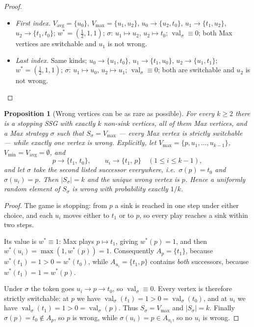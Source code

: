 \documentclass[11pt]{article}
\theoremstyle{plain}
\newtheorem{proposition}[theorem]{Proposition}
\theoremstyle{definition}
\DeclareMathOperator{\val}{val}
\newcommand{\Vmax}{V_{\max}}
\newcommand{\Vmin}{V_{\min}}
\newcommand{\Vavg}{V_{\mathrm{avg}}}
\begin{document}
\begin{proof}
\begin{itemize}[leftmargin=2.2em]
  $\sigma$: $u_4\mapsto u_1$, $u_5\mapsto u_0$;
  $\val_\sigma=(\tfrac16,\tfrac13,\tfrac23,\tfrac16,\tfrac13,\tfrac16)$;
  the current values are $\tfrac13$ at $u_4$ and $\tfrac16$ at $u_5$, and
  $u_5$ is not wrong.
\item \emph{First index.} $\Vavg=\{u_0\}$, $\Vmax=\{u_1,u_2\}$,
  $u_0\to\{u_2,t_0\}$, $u_1\to\{t_1,u_2\}$, $u_2\to\{t_1,t_0\}$;
  $w^\ast=(\tfrac12,1,1)$; $\sigma$: $u_1\mapsto u_2$, $u_2\mapsto t_0$;
  $\val_\sigma\equiv0$; both Max vertices are switchable and $u_1$ is
  not wrong.
\item \emph{Last index.} Same kinds; $u_0\to\{u_1,t_0\}$,
  $u_1\to\{t_1,u_0\}$, $u_2\to\{u_1,t_1\}$; $w^\ast=(\tfrac12,1,1)$;
  $\sigma$: $u_1\mapsto u_0$, $u_2\mapsto u_1$; $\val_\sigma\equiv0$; both
  are switchable and $u_2$ is not wrong.
\end{itemize}
\end{proof}

\begin{proposition}[Wrong vertices can be as rare as possible]\label{prop:needle}
For every $k\ge2$ there is a stopping SSG with exactly $k$ non-sink
vertices, all of them Max vertices, and a Max strategy $\sigma$ such that
$S_\sigma=\Vmax$ --- every Max vertex is strictly switchable --- while
exactly one vertex is wrong. Explicitly, let
$\Vmax=\{p,u_1,\dots,u_{k-1}\}$, $\Vmin=\Vavg=\emptyset$, and
\[
  p\to\{t_1,\,t_0\},\qquad u_i\to\{t_1,\,p\}\quad(1\le i\le k-1),
\]
and let $\sigma$ take the second listed successor everywhere, i.e.\
$\sigma(p)=t_0$ and $\sigma(u_i)=p$. Then $|S_\sigma|=k$ and the unique
wrong vertex is $p$. Hence a uniformly random element of $S_\sigma$ is
wrong with probability exactly $1/k$.
\end{proposition}

\begin{proof}
The game is stopping: from $p$ a sink is reached in one step under either
choice, and each $u_i$ moves either to $t_1$ or to $p$, so every play
reaches a sink within two steps.

Its value is $w^\ast\equiv1$: Max plays $p\mapsto t_1$, giving
$w^\ast(p)=1$, and then $w^\ast(u_i)=\max(1,w^\ast(p))=1$. Consequently
$A_p=\{t_1\}$, because $w^\ast(t_1)=1>0=w^\ast(t_0)$, while
$A_{u_i}=\{t_1,p\}$ contains \emph{both} successors, because
$w^\ast(t_1)=1=w^\ast(p)$.

Under $\sigma$ the token goes $u_i\to p\to t_0$, so $\val_\sigma\equiv0$.
Every vertex is therefore strictly switchable: at $p$ we have
$\val_\sigma(t_1)=1>0=\val_\sigma(t_0)$, and at $u_i$ we have
$\val_\sigma(t_1)=1>0=\val_\sigma(p)$. Thus $S_\sigma=\Vmax$ and
$|S_\sigma|=k$. Finally $\sigma(p)=t_0\notin A_p$, so $p$ is wrong, while
$\sigma(u_i)=p\in A_{u_i}$, so no $u_i$ is wrong.
\end{proof}
\end{document}
